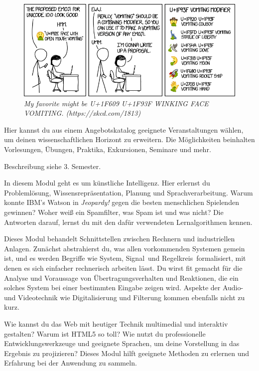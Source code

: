 \begin{figure}[b!]
\centering
\includegraphics[scale=.4]{img/xkcd/vomiting_emoji.png}
\caption*{{\small \textit{My favorite might be U+1F609 U+1F93F WINKING FACE VOMITING. (https://xkcd.com/1813)}}}
\end{figure}


Hier kannst du aus einem Angebotskatalog geeignete Veranstaltungen wählen, um deinen wissenschaftlichen Horizont zu erweitern.
Die Möglichkeiten beinhalten Vorlesungen, Übungen, Praktika, Exkursionen, Seminare und mehr.

Beschreibung siehe 3. Semester.

In diesem Modul geht es um künstliche Intelligenz.
Hier erlernst du Problemlösung, Wissensrepräsentation, Planung und Sprachverarbeitung.
Warum konnte IBM's Watson in \textit{Jeopardy!} gegen die besten menschlichen Spielenden gewinnen?
Woher weiß ein Spamfilter, was Spam ist und was nicht?
Die Antworten darauf, lernst du mit den dafür verwendeten Lernalgorithmen kennen.

Dieses Modul behandelt Schnittstellen zwischen Rechnern und industriellen Anlagen.
Zunächst abstrahierst du, was allen vorkommenden Systemen gemein ist, und es werden Begriffe wie \glqq System\grqq, \glqq Signal\grqq\ und \glqq Regelkreis\grqq\ formalisiert, mit denen es sich einfacher rechnerisch arbeiten lässt.
Du wirst fit gemacht für die Analyse und Voraussage von Übertragungsverhalten und Reaktionen, die ein solches System bei einer bestimmten Eingabe zeigen wird.
Aspekte der Audio- und Videotechnik wie Digitalisierung und Filterung kommen ebenfalls nicht zu kurz.

Wie kannst du das Web mit heutiger Technik multimedial und interaktiv gestalten? Warum ist HTML5 so toll?
Wie nutzt du professionelle Entwicklungswerkzeuge und geeignete Sprachen, um deine Vorstellung in das Ergebnis zu projizieren?
Dieses Modul hilft geeignete Methoden zu erlernen und Erfahrung bei der Anwendung zu sammeln.

